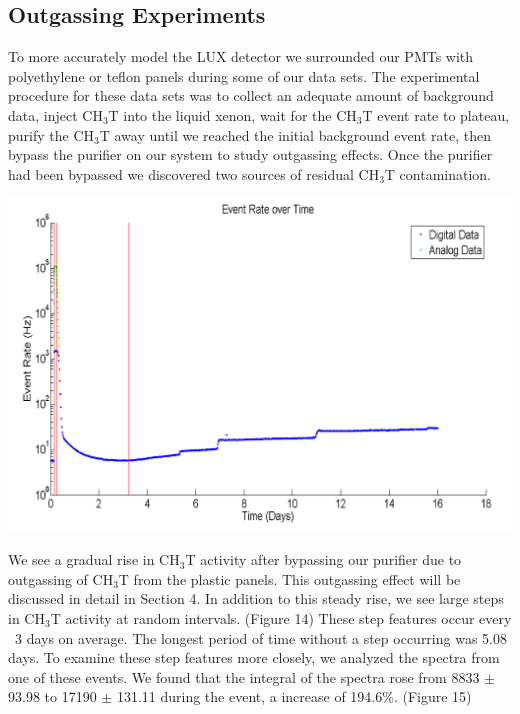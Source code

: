 \documentclass[a4paper,12pt]{article}
\begin{document}
\subsection{Outgassing Experiments}

To more accurately model the LUX detector we surrounded our PMTs with polyethylene or teflon panels during some of our data sets.  The experimental procedure for these data sets was to collect an adequate amount of background data, inject CH$_3$T into the liquid xenon, wait for the CH$_3$T event rate to plateau, purify the CH$_3$T away until we reached the initial background event rate, then bypass the purifier on our system to study outgassing effects.  Once the purifier had been bypassed we discovered two sources of residual CH$_3$T contamination.  

\begin{center}
\includegraphics[scale=0.4]{Outgassing_TimeHisto_Log.png}
\end{center}

We see a gradual rise in CH$_3$T activity after bypassing our purifier due to outgassing of CH$_3$T from the plastic panels.  This outgassing effect will be discussed in detail in Section 4. In addition to this steady rise, we see large steps in CH$_3$T activity at random intervals. (Figure 14)  These step features occur every ~3 days on average.  The longest period of time without a step occurring was 5.08 days. To examine these step features more closely, we analyzed the spectra from one of these events.  We found that the integral of the spectra rose from 8833 $\pm$ 93.98 to 17190 $\pm$ 131.11 during the event, a increase of 194.6\%. (Figure 15)  
\end{document}
